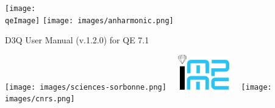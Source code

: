 \begin{center}
\def\version{1.2.0}
\def\qeImage{images/qe.png}


  \texttt{[image: \\qeImage]}
  \hspace{2cm} 
  \texttt{[image: images/anharmonic.png]}
  
	       \vspace{5.5cm}
  \Huge D3Q User Manual (v.\version) for QE 7.1 
  \vspace{5.5cm}

  \texttt{[image: images/sciences-sorbonne.png]}
  \hspace{2cm} 
  \includegraphics[width=3cm,height=1.5cm,keepaspectratio]{images/impmc.png}
  \hspace{2cm} 
  \texttt{[image: images/cnrs.png]}

\end{center}
